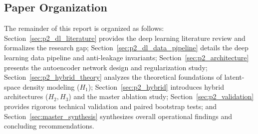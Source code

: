 \subsection{Paper Organization}
The remainder of this report is organized as follows: Section~\ref{sec:p2_dl_literature} provides the deep learning literature review and formalizes the research gap; Section~\ref{sec:p2_dl_data_pipeline} details the deep learning data pipeline and anti-leakage invariants; Section~\ref{sec:p2_architecture} presents the autoencoder network design and regularization study; Section~\ref{sec:p2_hybrid_theory} analyzes the theoretical foundations of latent-space density modeling ($H_1$); Section~\ref{sec:p2_hybrid} introduces hybrid architectures ($H_2, H_3$) and the master ablation study; Section~\ref{sec:p2_validation} provides rigorous technical validation and paired bootstrap tests; and Section~\ref{sec:master_synthesis} synthesizes overall operational findings and concluding recommendations.

